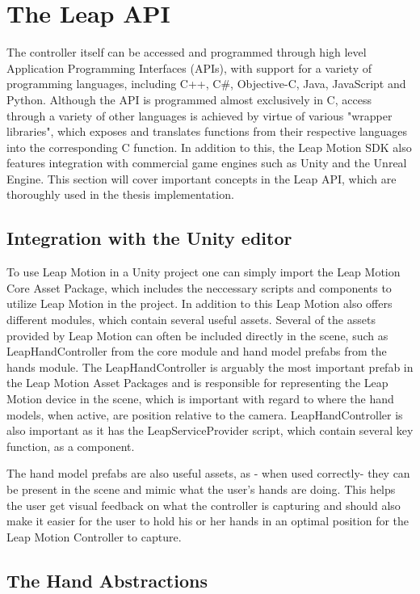 \section{The Leap API}
The controller itself can be accessed and programmed through high level Application Programming Interfaces (APIs), with support for a variety of programming languages, 
including C++, C\#, Objective-C, Java, JavaScript and Python. Although the API is programmed almost exclusively in C, access through a variety of other languages 
is achieved by virtue of various "wrapper libraries", which exposes and translates functions from their respective languages into the corresponding C function.
In addition to this, the Leap Motion SDK also features integration with commercial game engines such as Unity and the Unreal Engine. 
This section will cover important concepts in the Leap API, which are thoroughly used in the thesis implementation.

\subsection{Integration with the Unity editor}
To use Leap Motion in a Unity project one can simply import the Leap Motion Core Asset Package, which includes the neccessary scripts and components to utilize Leap Motion in the 
project. In addition to this Leap Motion also offers different modules, which contain several useful assets. 
Several of the assets provided by Leap Motion can often be included directly in the scene, such as LeapHandController from the core module and hand model prefabs 
from the hands module.
The LeapHandController is arguably the most important prefab in the Leap Motion Asset Packages and is responsible for representing the Leap Motion device 
in the scene, which is important with regard to where the hand models, when active, are position relative to the camera. 
LeapHandController is also important as it has the LeapServiceProvider script, which contain several key function, as a component.

The hand model prefabs are also useful assets, as - when used correctly- they can be present in the scene and mimic what the user's hands are doing.
This helps the user get visual feedback on what the controller is capturing and should also make it easier for the user to 
hold his or her hands in an optimal position for the Leap Motion Controller to capture.


\subsection{The Hand Abstractions}

